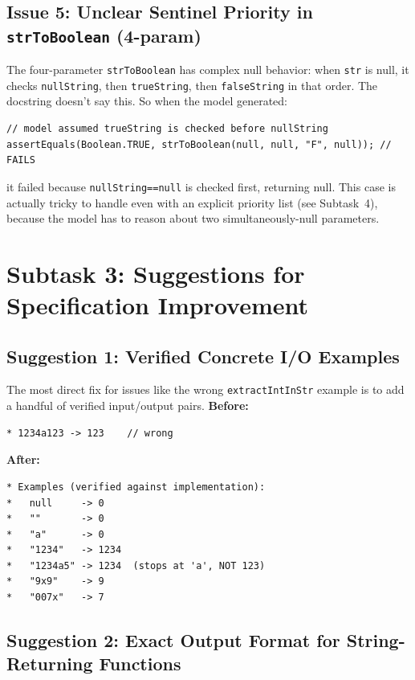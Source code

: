 \documentclass[acmsmall,nonacm]{acmart}
\begin{document}
\subsection{Issue 5: Unclear Sentinel Priority in \texttt{strToBoolean} (4-param)}

The four-parameter \texttt{strToBoolean} has complex null behavior: when \texttt{str} is
null, it checks \texttt{nullString}, then \texttt{trueString}, then \texttt{falseString}
in that order. The docstring doesn't say this. So when the model generated:
\begin{lstlisting}[style=java, numbers=none]
// model assumed trueString is checked before nullString
assertEquals(Boolean.TRUE, strToBoolean(null, null, "F", null)); // FAILS
\end{lstlisting}
it failed because \texttt{nullString==null} is checked first, returning null.
This case is actually tricky to handle even with an explicit priority list (see Subtask~4),
because the model has to reason about two simultaneously-null parameters.


\section{Subtask 3: Suggestions for Specification Improvement}

\subsection{Suggestion 1: Verified Concrete I/O Examples}

The most direct fix for issues like the wrong \texttt{extractIntInStr} example is to add
a handful of verified input/output pairs. 
\noindent\textbf{Before:}
\begin{lstlisting}[style=java, numbers=none]
* 1234a123 -> 123    // wrong
\end{lstlisting}

\noindent\textbf{After:}
\begin{lstlisting}[style=java, numbers=none]
* Examples (verified against implementation):
*   null     -> 0
*   ""       -> 0
*   "a"      -> 0
*   "1234"   -> 1234
*   "1234a5" -> 1234  (stops at 'a', NOT 123)
*   "9x9"    -> 9
*   "007x"   -> 7
\end{lstlisting}


\subsection{Suggestion 2: Exact Output Format for String-Returning Functions}
\end{document}
